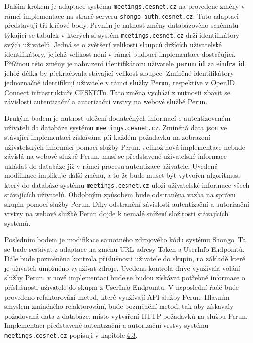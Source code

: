 \documentclass[
  printed, %
  twoside, %
  table,   %
  nolof,     %
  nolot,     %
]{fithesis3}
\begin{document}
Dalším krokem je adaptace systému \texttt{meetings.cesnet.cz} na provedené změny v rámci implementace na straně serveru \texttt{shongo-auth.cesnet.cz}. Tuto adaptaci představují tři klíčové body. Prvním je nutnost změny databázového schématu týkající se tabulek v kterých si systém \texttt{meetings.cesnet.cz} drží identifikátory svých uživatelů. Jedná se o zvětšení velikosti sloupců držících uživatelské identifikátory, jejichž velikost není v rámci budoucí implementace dostačující. Příčinou této změny je nahrazení identifikátoru uživatele \textbf{perun id} za \textbf{einfra id}, jehož délka by překračovala stávající velikost sloupce. Zmíněné identifikátory jednoznačně identifikují uživatele v rámci služby Perun, respektive v OpenID Connect infrastruktuře CESNETu. Tato změna vychází z nutnosti zbavit se závislosti autentizační a autorizační vrstvy na webové službě Perun. \par

Druhým bodem je nutnost uložení dodatečných informací o autentizovaném uživateli do databáze systému \texttt{meetings.cesnet.cz}. Zmíněná data jsou ve stávající implementaci získávána při každém požadavku na zobrazení uživatelských informací pomocí služby Perun. Jelikož nová implementace nebude závislá na webové službě Perun, musí se představené uživatelské informace ukládat do databáze již v rámci procesu autentizace uživatele. Uvedená modifikace implikuje další změnu, a to že bude muset být vytvořen algoritmus, který do databáze systému \texttt{meetings.cesnet.cz} uloží uživatelské informace všech stávajících uživatelů. Obdobným způsobem bude odstraněna vazba na správu skupin pomocí služby Perun. Díky odstranění závislosti autentizační a autorizační vrstvy na webové službě Perun dojde k nemalé snížení složitosti stávajících systémů.  \par 

Posledním bodem je modifikace samotného zdrojového kódu systému Shongo. Ta se bude sestávat z adaptace na změnu URL adresy Token a UserInfo Endpointů. Dále bude pozměněna kontrola příslušnosti uživatele do skupin, na základě které je uživateli umožněno využívat zdroje. Uvedená kontrola dříve využívala volání služby Perun, v nové implementaci bude se budou získávat potřebné informace o příslušnosti uživatele do skupin z UserInfo Endpointu. V neposlední řadě bude provedeno refaktorování metod, které využívají API služby Perun. Hlavním smyslem zmíněného refaktorování, bude pozměnění metod, tak aby získavaly požadovaná data z databáze, místo vytváření HTTP požadavků na službu Perun. Implementaci  představené autentizační a autorizační vrstvy systému \texttt{meetings.cesnet.cz} popisuji v kapitole \hyperref[ShongoImpl]{4.3}.
\end{document}
